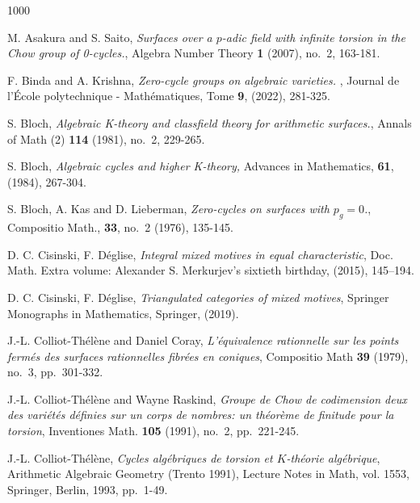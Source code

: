 \documentclass[12pt]{amsart}
\theoremstyle{remark}
\renewcommand{\1}{{\mathbb{S}}}
\newcommand{\<}{\langle}
\renewcommand{\>}{\rangle}
\begin{document}
\vspace{10pt}
	\begin{thebibliography}{1000}
    

 M. Asakura and S. Saito, {\sl Surfaces over a {$p$}-adic field with infinite torsion in the
              {C}how group of 0-cycles.\/}, Algebra Number Theory \textbf{1} (2007), no.~2, 163-181. 


 F. Binda and A. Krishna, {\sl Zero-cycle groups on algebraic varieties. \/}, Journal de l’École polytechnique - Mathématiques, Tome \textbf{9}, (2022), 281-325.

        
 S. Bloch, {\sl Algebraic K-theory and classfield theory for arithmetic surfaces.\/}, Annals of Math (2) \textbf{114} (1981), no.~2, 229-265. 


 S. Bloch, {\sl Algebraic cycles and higher K-theory,\/} Advances in Mathematics, \textbf{61}, (1984), 267-304.

 S. Bloch, A. Kas and D. Lieberman, {\sl Zero-cycles on surfaces with $p_g=0$.\/}, Compositio Math.,  \textbf{33}, no.~2 (1976), 135-145. 

  D. C. Cisinski, F. D\'{e}glise, \textit{Integral mixed motives in equal characteristic}, Doc. Math. Extra volume:
Alexander S. Merkurjev’s sixtieth birthday, (2015), 145–194.

 D. C. Cisinski, F. D\'{e}glise, \textit{Triangulated categories of mixed motives}, Springer Monographs in Mathematics, Springer, (2019).  


     J.-L. Colliot-Th\'{e}l\`{e}ne and Daniel Coray, \textit{L'\'{e}quivalence rationnelle sur les points ferm\'{e}s des surfaces rationnelles fibr\'{e}es en coniques}, Compositio Math \textbf{39} (1979), no.~3, pp.~301-332. \ 

       J.-L. Colliot-Th\'{e}l\`{e}ne and Wayne Raskind, \textit{Groupe de Chow de codimension deux des vari\'{e}t\'{e}s d\'{e}finies sur un corps de nombres: un th\'{e}or\`{e}me de finitude pour la torsion}, Inventiones Math. \textbf{105} (1991), no.~2, pp.~221-245. \ 
		
	 J.-L. Colliot-Th\'{e}l\`{e}ne, \textit{Cycles alg\'{e}briques de torsion et $K$-th\'{e}orie alg\'{e}brique}, Arithmetic Algebraic Geometry (Trento 1991), Lecture Notes in Math, vol. 1553, Springer, Berlin, 1993, pp.~1-49.  


\end{thebibliography}
\end{document}
